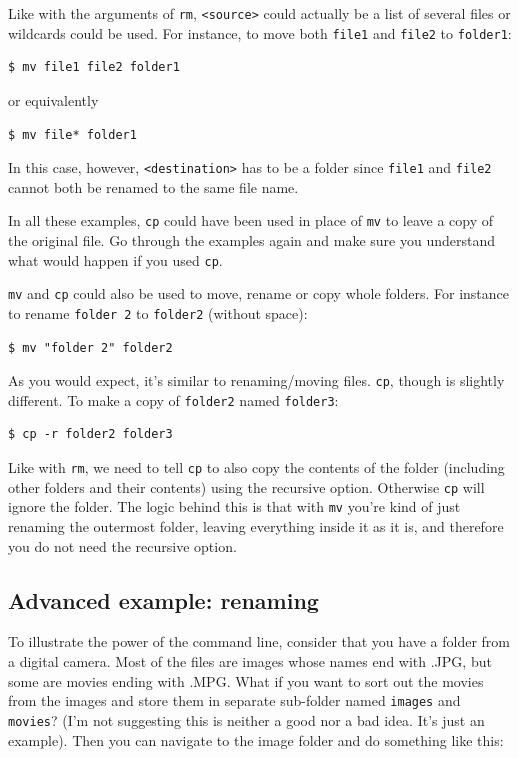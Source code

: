 Like with the arguments of \verb|rm|, \verb|<source>| could actually be a list of several files or wildcards could be used. For instance, to move both \verb|file1| and \verb|file2| to \verb|folder1|:

\begin{verbatim}
$ mv file1 file2 folder1
\end{verbatim}
or equivalently
\begin{verbatim}
$ mv file* folder1
\end{verbatim}
In this case, however, \verb|<destination>| has to be a folder since \verb|file1| and \verb|file2| cannot both be renamed to the same file name. 

In all these examples, \verb|cp| could have been used in place of \verb|mv| to leave a copy of the original file. Go through the examples again and make sure you understand what would happen if you used \verb|cp|.

\verb|mv| and \verb|cp| could also be used to move, rename or copy whole folders. For instance to rename \verb|folder 2| to \verb|folder2| (without space):

\begin{verbatim}
$ mv "folder 2" folder2
\end{verbatim}
As you would expect, it's similar to renaming/moving files. \verb|cp|, though is slightly different. To make a copy of \verb|folder2| named \verb|folder3|:

\begin{verbatim}
$ cp -r folder2 folder3
\end{verbatim}
Like with \verb|rm|, we need to tell \verb|cp| to also copy the contents of the folder (including other folders and their contents) using the recursive option. Otherwise \verb|cp| will ignore the folder. The logic behind this is that with \verb|mv| you're kind of just renaming the outermost folder, leaving everything inside it as it is, and therefore you do not need the recursive option.

\subsection{Advanced example: renaming}
To illustrate the power of the command line, consider that you have a folder from a digital camera. Most of the files are images whose names end with .JPG, but some are movies ending with .MPG. What if you want to sort out the movies from the images and store them in separate sub-folder named \verb|images| and \verb|movies|? (I'm not suggesting this is neither a good nor a bad idea. It's just an example). Then you can navigate to the image folder and do something like this:

